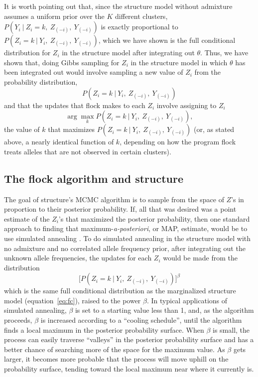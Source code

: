 It is worth pointing out that, since the
{\sc structure} model without admixture assumes a uniform prior over 
the $K$ different clusters, $P(Y_{i}~|~Z_i=k,~Z_{(-i)},~Y_{(-i)})$
is exactly proportional to $P(Z_i=k~|~Y_i, ~Z_{(-i)},~Y_{(-i)})$, which 
we have shown is the
full conditional distribution for $Z_i$ in the {\sc structure} model after
integrating out $\theta$.  Thus, we have shown that, doing Gibbs
sampling for $Z_i$ in  the {\sc structure} model in which $\theta$ has been
integrated out would involve sampling a new value of $Z_i$ from the 
probability distribution,
\[
P(Z_i=k~|~Y_i, ~Z_{(-i)},~Y_{(-i)})
\]
and that the updates that
{\sc flock} makes to each $Z_i$ involve assigning to $Z_i$
\begin{equation}
\arg\max_k P(Z_i=k~|~Y_i, ~Z_{(-i)},~Y_{(-i)}),
\end{equation}
\ie the value of $k$ that maximizes $P(Z_i=k~|~Y_i, ~Z_{(-i)},~Y_{(-i)})$
(or, as stated above, a nearly identical function of $k$, depending on how
the program {\sc flock} treats alleles that are not observed in certain clusters).






\subsection*{The {\sc flock} algorithm and {\sc structure}}
The goal of {\sc structure}'s MCMC algorithm is to sample from the space of 
$Z$'s in proportion to their posterior probability.  If, all that was desired
was a point estimate of the $Z_i$'s that maximized the posterior probability,
then one standard approach to finding that maximum-{\em a-posteriori}, or MAP, 
estimate, would be to use simulated annealing \citep{Kirkpatricketal1983}.
To do simulated annealing in the {\sc structure} model with no admixture and
no correlated allele frequency prior, after integrating out the unknown
allele frequencies, the updates for each $Z_i$ would be made from the 
distribution
\[
\biggl[P(Z_i=k~|~Y_i, ~Z_{(-i)},~Y_{(-i)})\biggr]^\beta
\]
which is the same full conditional distribution as the marginalized {\sc structure}
model (equation~\ref{eq:fc}), raised
to the power $\beta$.  In typical applications of simulated annealing,
$\beta$ is set to a starting value less than 1, and, as the algorithm proceeds,
$\beta$ is increased according to a ``cooling schedule''\citep{Hajek1988}, until
the algorithm finds a local maximum in the posterior probability surface.  
When $\beta$ is small, the process can easily traverse ``valleys''
in the posterior probability surface and has a better chance of searching
more of the space for the maximum value.  As $\beta$ gets larger, it becomes
more probable that the process will
move uphill on the probability surface, tending toward the local
maximum near where it currently is.    

